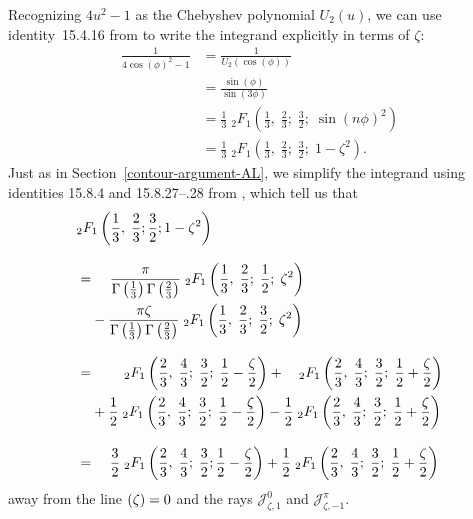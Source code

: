 \documentclass{article}
\let\Re\relax
\DeclareMathOperator{\Re}{Re}
\theoremstyle{definition}
\theoremstyle{plain}
\begin{document}
Recognizing $4u^2 - 1$ as the Chebyshev polynomial $U_2(u)$, we can use identity~15.4.16 from \cite{dlmf} to write the integrand explicitly in terms of $\zeta$:
\begin{align*}
\frac{1}{4 \cos(\phi)^2 - 1} & = \frac{1}{U_2(\cos(\phi))} \\
& = \frac{\sin(\phi)}{\sin(3\phi)} \\
& = \frac{1}{3}\;{}_2F_1\left(\frac{1}{3},\;\frac{2}{3};\;\frac{3}{2};\;\sin(n \phi)^2\right) \\
& = \frac{1}{3}\;{}_2F_1\left(\frac{1}{3},\;\frac{2}{3};\;\frac{3}{2};\;1 - \zeta^2\right).
\end{align*}
Just as in Section~\ref{contour-argument-AL}, we simplify the integrand using identities 15.8.4 and 15.8.27\;--.28 from \cite{dlmf}, which tell us that\begin{align*}
&{}_2F_1\left(\frac{1}{3},\;\frac{2}{3}; \frac{3}{2}; 1 - \zeta^2\right) \\[3mm]
& =\; \hphantom{+} \frac{\pi}{\Gamma\left(\frac{1}{3}\right) \Gamma\left(\frac{2}{3}\right)}\;{}_2F_1\left(\frac{1}{3},\;\frac{2}{3};\;\frac{1}{2};\;\zeta^2\right) \\
& \hphantom{=}\; - \frac{\pi \zeta}{\Gamma\left(\frac{1}{3}\right) \Gamma\left(\frac{2}{3}\right)}\;{}_2F_1\left(\frac{1}{3},\;\frac{2}{3};\;\frac{3}{2};\;\zeta^2\right) \\[3mm]
& =\; \hphantom{+ \frac{0}{0}}\;{}_2F_1\left(\frac{2}{3},\;\frac{4}{3};\;\frac{3}{2};\;\frac{1}{2} - \frac{\zeta}{2}\right) + \hphantom{\frac{0}{0}}\;{}_2F_1\left(\frac{2}{3},\;\frac{4}{3};\;\frac{3}{2};\;\frac{1}{2} + \frac{\zeta}{2}\right) \\
& \hphantom{=}\; + \frac{1}{2}\;{}_2F_1\left(\frac{2}{3},\;\frac{4}{3};\;\frac{3}{2};\;\frac{1}{2} - \frac{\zeta}{2}\right) - \frac{1}{2}\;{}_2F_1\left(\frac{2}{3},\;\frac{4}{3};\;\frac{3}{2};\;\frac{1}{2} + \frac{\zeta}{2}\right) \\[3mm]
& =\; \hphantom{+} \frac{3}{2}\;{}_2F_1\left(\frac{2}{3},\;\frac{4}{3};\;\frac{3}{2};\frac{1}{2} - \frac{\zeta}{2}\right) + \frac{1}{2}\;{}_2F_1\left(\frac{2}{3},\;\frac{4}{3};\;\frac{3}{2};\;\frac{1}{2} + \frac{\zeta}{2}\right)
\end{align*}
away from the line $\Re(\zeta) = 0$ and the rays $\mathcal{J}^0_{\zeta,1}$ and $\mathcal{J}^\pi_{\zeta,-1}$.
\end{document}

